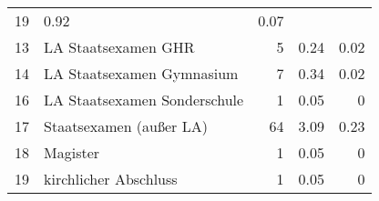 \begin{longtable}{lXrrr}
       \num{19} &
       \num[round-mode=places,round-precision=2]{0.92} &
         \num[round-mode=places,round-precision=2]{0.07} \\

     13 &
     \multicolumn{1}{X}{ LA Staatsexamen GHR   } &


       \num{5} &
       \num[round-mode=places,round-precision=2]{0.24} &
         \num[round-mode=places,round-precision=2]{0.02} \\

     14 &
     \multicolumn{1}{X}{ LA Staatsexamen Gymnasium   } &


       \num{7} &
       \num[round-mode=places,round-precision=2]{0.34} &
         \num[round-mode=places,round-precision=2]{0.02} \\

     16 &
     \multicolumn{1}{X}{ LA Staatsexamen Sonderschule   } &


       \num{1} &
       \num[round-mode=places,round-precision=2]{0.05} &
         \num[round-mode=places,round-precision=2]{0} \\

     17 &
     \multicolumn{1}{X}{ Staatsexamen (außer LA)   } &


       \num{64} &
       \num[round-mode=places,round-precision=2]{3.09} &
         \num[round-mode=places,round-precision=2]{0.23} \\

     18 &
     \multicolumn{1}{X}{ Magister   } &


       \num{1} &
       \num[round-mode=places,round-precision=2]{0.05} &
         \num[round-mode=places,round-precision=2]{0} \\

     19 &
     \multicolumn{1}{X}{ kirchlicher Abschluss   } &


       \num{1} &
       \num[round-mode=places,round-precision=2]{0.05} &
         \num[round-mode=places,round-precision=2]{0} \\


\end{longtable}
